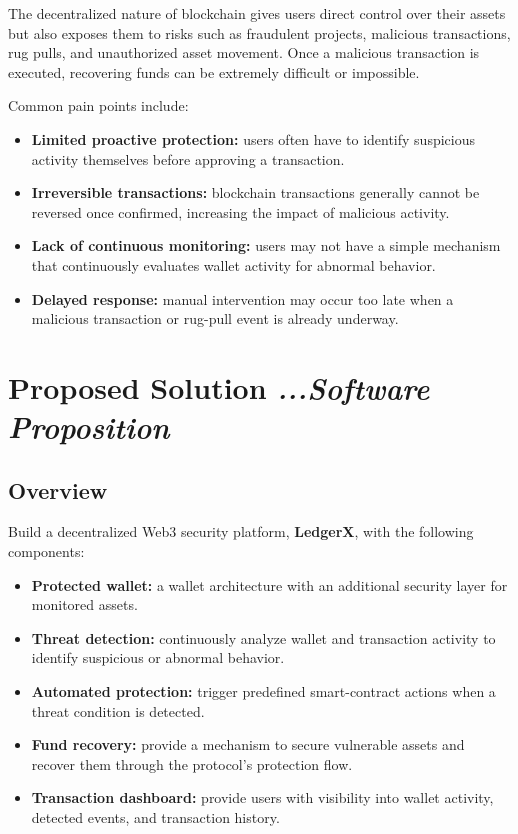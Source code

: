 \documentclass[10pt,a4paper]{article}
\begin{document}
The decentralized nature of blockchain gives users direct control over their assets but also exposes them to risks such as fraudulent projects, malicious transactions, rug pulls, and unauthorized asset movement. Once a malicious transaction is executed, recovering funds can be extremely difficult or impossible.

Common pain points include:

\begin{itemize}
    \item \textbf{Limited proactive protection:} users often have to identify suspicious activity themselves before approving a transaction.

    \item \textbf{Irreversible transactions:} blockchain transactions generally cannot be reversed once confirmed, increasing the impact of malicious activity.

    \item \textbf{Lack of continuous monitoring:} users may not have a simple mechanism that continuously evaluates wallet activity for abnormal behavior.

    \item \textbf{Delayed response:} manual intervention may occur too late when a malicious transaction or rug-pull event is already underway.
\end{itemize}

\section{Proposed Solution \hfill \normalfont\itshape ...Software Proposition}

\subsection{Overview}

Build a decentralized Web3 security platform, \textbf{LedgerX}, with the following components:

\begin{itemize}
    \item \textbf{Protected wallet:} a wallet architecture with an additional security layer for monitored assets.

    \item \textbf{Threat detection:} continuously analyze wallet and transaction activity to identify suspicious or abnormal behavior.

    \item \textbf{Automated protection:} trigger predefined smart-contract actions when a threat condition is detected.

    \item \textbf{Fund recovery:} provide a mechanism to secure vulnerable assets and recover them through the protocol's protection flow.

    \item \textbf{Transaction dashboard:} provide users with visibility into wallet activity, detected events, and transaction history.
\end{itemize}
\end{document}

